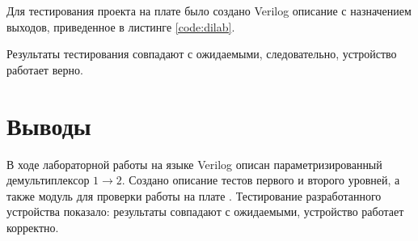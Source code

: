 Для тестирования проекта на плате было создано Verilog описание с назначением выходов, приведенное в листинге  \ref{code:dilab}.


Результаты тестирования совпадают с ожидаемыми, следовательно, устройство работает верно.

\section{Выводы}

В ходе лабораторной работы на языке Verilog описан параметризированный демультиплексор $1 \rightarrow 2$. Создано описание тестов первого и второго уровней, а также модуль для проверки работы на плате . Тестирование разработанного устройства показало: результаты совпадают с ожидаемыми, устройство работает корректно.

